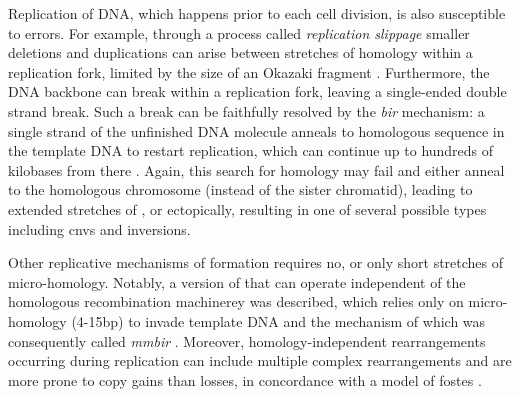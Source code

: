 Replication of DNA, which happens prior to each cell division, is also
susceptible to errors. For example, through a process called \textit{replication
slippage} smaller deletions and duplications can arise between stretches of
homology within a replication fork, limited by the size of an Okazaki fragment
\citep{Hastings2009}. Furthermore, the DNA backbone can break within a
replication fork, leaving a single-ended double strand break. Such a break can
be faithfully resolved by the \emph{\acf{bir}} mechanism: a single strand of the
unfinished DNA molecule anneals to homologous sequence in the template DNA to
restart replication, which can continue up to hundreds of kilobases from there
\citep{Carvalho2016}. Again, this search for homology may fail and either anneal
to the homologous chromosome (instead of the sister chromatid), leading to
extended stretches of \loh, or ectopically, resulting in one of several possible
\sv types including \acp{cnv} and inversions.

Other replicative mechanisms of \sv formation requires no, or only short
stretches of micro-homology. Notably, a version of \bir that can operate
independent of the homologous recombination machinerey was described, which
relies only on micro-homology (4-15bp) to invade template DNA and the mechanism
of which was consequently called \emph{\acf{mmbir}} \citep{Hastings2009a}.
Moreover, homology-independent rearrangements occurring during replication can
include multiple complex rearrangements and are more prone to copy gains than
losses, in concordance with a model of \acf{fostes} \citep{Zhang2009a,Hastings2009}.
